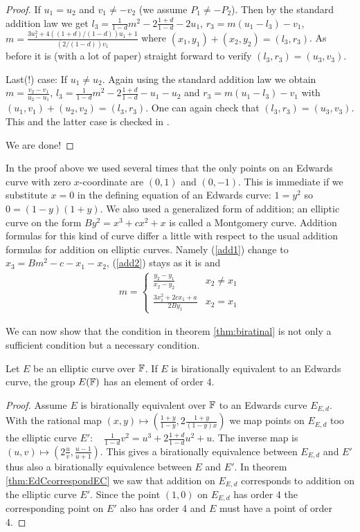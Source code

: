 \begin{proof}
If $u_1=u_2$ and $v_1\neq -v_2$ (we assume $P_1\neq -P_2$). Then by the standard addition law we get $l_3=\frac{1}{1-d}m^2-2\frac{1+d}{1-d}-2u_1$, $r_3=m(u_1-l_3)-v_1$, $m=\frac{3u_1^2+4((1+d)/(1-d))u_1+1}{(2/(1-d))v_1}$ where $(x_1,y_1)+(x_2,y_2)=(l_3,r_3)$. As before it is (with a lot of paper) straight forward to verify $(l_3,r_3)=(u_3,v_3)$.

Last(!) case: If $u_1\neq u_2$. Again using the standard addition law we obtain $m=\frac{v_2-v_1}{u_2-u_1}$, $l_3=\frac{1}{1-d}m^2-2\frac{1+d}{1-d}-u_1-u_2$ and $r_3=m(u_1-l_3)-v_1$ with $(u_1,v_1)+(u_2,v_2)=(l_3,r_3)$. One can again check that $(l_3,r_3)=(u_3,v_3)$. This and the latter case is checked in \cite{EFD}.

We are done!
\end{proof}
\begin{rem}
\label{rem:commentsProof}
In the proof above we used several times that the only points on an Edwards curve with zero $x$-coordinate are $(0,1)$ and $(0,-1)$. This is immediate if we substitute $x=0$ in the defining equation of an Edwards curve: $1=y^2$ so $0=(1-y)(1+y)$. We also used a generalized form of addition; an elliptic curve on the form $By^2 = x^3+cx^2+x$ is called a Montgomery curve. Addition formulas for this kind of curve differ a little with respect to the usual addition formulas for addition on elliptic curves. Namely (\ref{add1}) change to $x_3=Bm^2-c-x_1-x_2$, (\ref{add2}) stays as it is and 
\begin{align*}
	m = \begin{cases} 
		\frac{y_2-y_1}{x_2-y_2} & x_2\neq x_1 \\
		\frac{3x_1^2+2cx_1+a}{2By_1} & x_2= x_1
		\end{cases}				
\end{align*}
\end{rem}
 
We can now show that the condition in theorem \ref{thm:biratinal} is not only a sufficient condition but a necessary condition. 
\begin{thm}\label{thm:pointoforderfour}
Let $E$ be an elliptic curve over $\mathbb{F}$. If $E$ is birationally equivalent to an Edwards curve, the group $E(\mathbb{F})$ has an element of order 4. 
\end{thm}
\begin{proof}
Assume $E$ is birationally equivalent over $\mathbb{F}$ to an Edwards curve $E_{E,d}$. With the rational map $(x,y)\mapsto \left(\frac{1+y}{1-y},2\frac{1+y}{(1-y)x}\right)$ we map points on $E_{E,d}$ too the elliptic curve $E':\quad\frac{1}{1-d}v^2=u^3+2\frac{1+d}{1-d}u^2+u$. The inverse map is $(u,v)\mapsto \left(2\frac{u}{v},\frac{u-1}{u+1}\right)$. This gives a birationally equivalence between $E_{E,d}$ and $E'$ thus also a birationally equivalence between $E$ and $E'$. In theorem \ref{thm:EdCcorrespondEC} we saw that addition on $E_{E,d}$ corresponds to addition on the elliptic curve $E'$. Since the point $(1,0)$ on $E_{E,d}$ has order 4 the corresponding point on $E'$ also has order 4 and $E$ must have a point of order 4.  
\end{proof}

